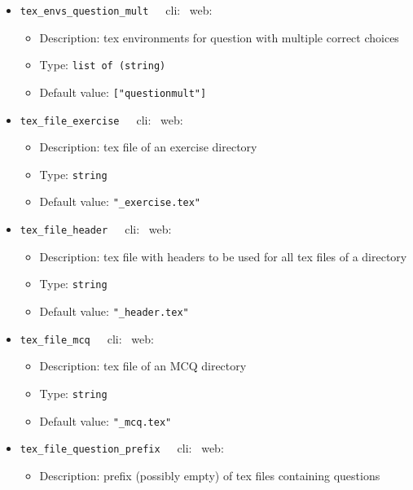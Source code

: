 {\begin{itemize}[itemsep=0pt,parsep=0pt,topsep=0pt,partopsep=0pt]
\begin{itemize}[itemsep=0pt,parsep=0pt,topsep=0pt,partopsep=0pt]
  \item Default value:  {\tt{["question", "questionmult"]}}
  \end{itemize}
\item{\tt{tex\_envs\_question\_mult}}~~~cli: \cmark~web: \xmark
  \begin{itemize}[itemsep=0pt,parsep=0pt,topsep=0pt,partopsep=0pt]
  \item Description:  tex environments for question with multiple correct choices
  \item Type:  {\tt{list of (string)}}
  \item Default value:  {\tt{["questionmult"]}}
  \end{itemize}
\item{\tt{tex\_file\_exercise}}~~~cli: \cmark~web: \xmark
  \begin{itemize}[itemsep=0pt,parsep=0pt,topsep=0pt,partopsep=0pt]
  \item Description:  tex file of an exercise directory
  \item Type:  {\tt{string}}
  \item Default value:  {\tt{"\_exercise.tex"}}
  \end{itemize}
\item{\tt{tex\_file\_header}}~~~cli: \cmark~web: \xmark
  \begin{itemize}[itemsep=0pt,parsep=0pt,topsep=0pt,partopsep=0pt]
  \item Description:  tex file with headers to be used for all tex files of a directory
  \item Type:  {\tt{string}}
  \item Default value:  {\tt{"\_header.tex"}}
  \end{itemize}
\item{\tt{tex\_file\_mcq}}~~~cli: \cmark~web: \xmark
  \begin{itemize}[itemsep=0pt,parsep=0pt,topsep=0pt,partopsep=0pt]
  \item Description:  tex file of an MCQ directory
  \item Type:  {\tt{string}}
  \item Default value:  {\tt{"\_mcq.tex"}}
  \end{itemize}
\item{\tt{tex\_file\_question\_prefix}}~~~cli: \cmark~web: \xmark
  \begin{itemize}[itemsep=0pt,parsep=0pt,topsep=0pt,partopsep=0pt]
  \item Description:  prefix (possibly empty) of tex files containing questions

\end{itemize}
\end{itemize}}

